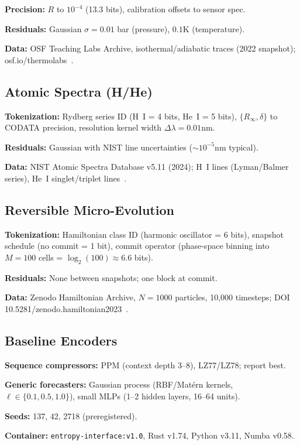 \documentclass[11pt,letterpaper]{article}
\theoremstyle{definition}
\theoremstyle{remark}
\begin{document}
\textbf{Precision:} \(R\) to \(10^{-4}\) (13.3 bits), calibration offsets to sensor spec.

\textbf{Residuals:} Gaussian \(\sigma=0.01\) bar (pressure), \(0.1\)K (temperature).

\textbf{Data:} OSF Teaching Labs Archive, isothermal/adiabatic traces (2022 snapshot); osf.io/thermolabs~\cite{OSF_ThermoLabs}.

\subsection{Atomic Spectra (H/He)}

\textbf{Tokenization:} Rydberg series ID (H~I = 4 bits, He~I = 5 bits), \(\{R_\infty,\delta\}\) to CODATA precision, resolution kernel width \(\Delta\lambda=0.01\)nm.

\textbf{Residuals:} Gaussian with NIST line uncertainties (\(\sim 10^{-5}\)nm typical).

\textbf{Data:} NIST Atomic Spectra Database v5.11 (2024); H~I lines (Lyman/Balmer series), He~I singlet/triplet lines~\cite{NIST_ASD}.

\subsection{Reversible Micro-Evolution}

\textbf{Tokenization:} Hamiltonian class ID (harmonic oscillator = 6 bits), snapshot schedule (no commit = 1 bit), commit operator (phase-space binning into \(M=100\) cells = \(\log_2(100)\approx 6.6\) bits).

\textbf{Residuals:} None between snapshots; one block at commit.

\textbf{Data:} Zenodo Hamiltonian Archive, \(N=1000\) particles, 10,000 timesteps; DOI 10.5281/zenodo.hamiltonian2023~\cite{Zenodo_Hamiltonian}.

\subsection{Baseline Encoders}

\textbf{Sequence compressors:} PPM (context depth 3--8), LZ77/LZ78; report best.

\textbf{Generic forecasters:} Gaussian process (RBF/Matérn kernels, \(\ell\in\{0.1,0.5,1.0\}\)), small MLPs (1--2 hidden layers, 16--64 units).

\textbf{Seeds:} 137, 42, 2718 (preregistered).

\textbf{Container:} \texttt{entropy-interface:v1.0}, Rust v1.74, Python v3.11, Numba v0.58.
\end{document}
